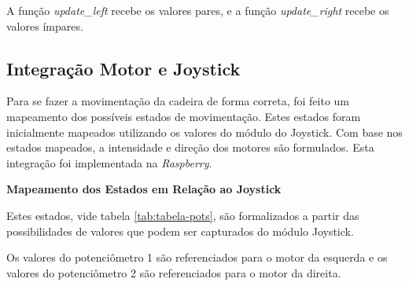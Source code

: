     A função \textit{update\_left} recebe os valores pares, e a função \textit{update\_right} recebe os valores ímpares.

\subsection{Integração Motor e Joystick}

Para se fazer a movimentação da cadeira de forma correta, foi feito um mapeamento dos possíveis estados de movimentação. Estes estados foram inicialmente mapeados utilizando os valores do módulo do Joystick. Com base nos estados mapeados, a intensidade e direção dos motores são formulados. Esta integração foi implementada na \textit{Raspberry}.

  \textbf{Mapeamento dos Estados em Relação ao Joystick}

  Estes estados, vide tabela \ref{tab:tabela-pots}, são formalizados a partir das possibilidades de valores que podem ser capturados do módulo Joystick.

  Os valores do potenciômetro 1 são referenciados para o motor da esquerda e os valores do potenciômetro 2 são referenciados para o motor da direita.

  \begin{table}[!ht]
  \centering
  \caption{Mapeamento dos estados conforme valores do Joystick}
  \label{tab:tabela-pots}
  \end{table}

